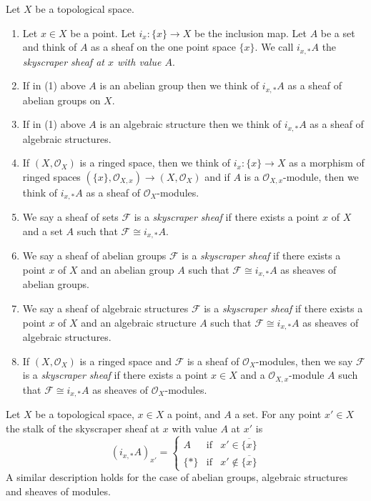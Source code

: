 \begin{definition}
\label{definition-skyscraper-sheaf}
Let $X$ be a topological space.
\begin{enumerate}
\item Let $x \in X$ be a point. Let $i_x : \{x\} \to X$ be the inclusion map.
Let $A$ be a set and think of $A$ as a sheaf on the one point space $\{x\}$.
We call $i_{x, *}A$ the {\it skyscraper sheaf at $x$ with value $A$}.
\item If in (1) above $A$ is an abelian group then we think of
$i_{x, *}A$ as a sheaf of abelian groups on $X$.
\item If in (1) above $A$ is an algebraic structure then we think
of $i_{x, *}A$ as a sheaf of algebraic structures.
\item If $(X, \mathcal{O}_X)$ is a ringed space, then we think
of $i_x : \{x\} \to X$ as a morphism of ringed spaces
$(\{x\}, \mathcal{O}_{X, x}) \to (X, \mathcal{O}_X)$
and if $A$ is a $\mathcal{O}_{X, x}$-module, then we think
of $i_{x, *}A$ as a sheaf of $\mathcal{O}_X$-modules.
\item We say a sheaf of sets $\mathcal{F}$ is a {\it skyscraper sheaf}
if there exists a point $x$ of $X$ and a set $A$ such
that $\mathcal{F} \cong i_{x, *}A$.
\item We say a sheaf of abelian groups $\mathcal{F}$ is a
{\it skyscraper sheaf} if there exists a point $x$ of $X$
and an abelian group $A$ such that $\mathcal{F} \cong i_{x, *}A$
as sheaves of abelian groups.
\item We say a sheaf of algebraic structures $\mathcal{F}$ is a
{\it skyscraper sheaf} if there exists a point $x$ of $X$
and an algebraic structure $A$ such that $\mathcal{F} \cong i_{x, *}A$
as sheaves of algebraic structures.
\item If $(X, \mathcal{O}_X)$ is a ringed space and
$\mathcal{F}$ is a sheaf of $\mathcal{O}_X$-modules, then
we say $\mathcal{F}$ is a {\it skyscraper sheaf} if there
exists a point $x \in X$ and a $\mathcal{O}_{X, x}$-module
$A$ such that $\mathcal{F} \cong i_{x, *}A$
as sheaves of $\mathcal{O}_X$-modules.
\end{enumerate}
\end{definition}

\begin{lemma}
\label{lemma-skyscraper-stalks}
Let $X$ be a topological space, $x \in X$ a point, and
$A$ a set. For any point $x' \in X$ the stalk of the
skyscraper sheaf at $x$ with value $A$ at $x'$ is
$$
(i_{x, *}A)_{x'} =
\left\{
\begin{matrix}
A & \text{if} & x' \in \overline{\{x\}} \\
\{*\} & \text{if} & x' \not\in \overline{\{x\}}
\end{matrix}
\right.
$$
A similar description holds for the case of
abelian groups, algebraic structures and
sheaves of modules.
\end{lemma}

